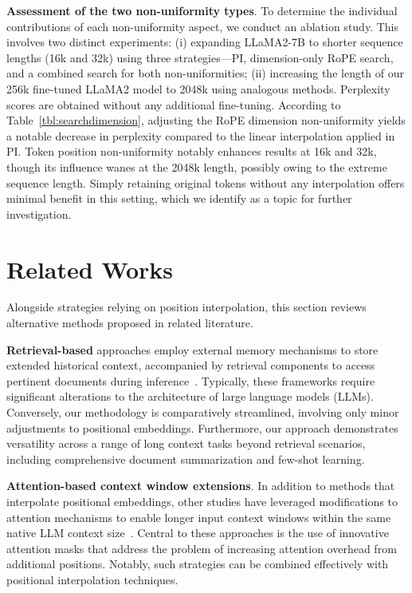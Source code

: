 \textbf{Assessment of the two non-uniformity types}. To determine the individual contributions of each non-uniformity aspect, we conduct an ablation study. This involves two distinct experiments: (i) expanding LLaMA2-7B to shorter sequence lengths (16k and 32k) using three strategies—PI, dimension-only RoPE search, and a combined search for both non-uniformities; (ii) increasing the length of our 256k fine-tuned LLaMA2 model to 2048k using analogous methods. Perplexity scores are obtained without any additional fine-tuning. According to Table~\ref{tbl:searchdimension}, adjusting the RoPE dimension non-uniformity yields a notable decrease in perplexity compared to the linear interpolation applied in PI. Token position non-uniformity notably enhances results at 16k and 32k, though its influence wanes at the 2048k length, possibly owing to the extreme sequence length. Simply retaining original tokens without any interpolation offers minimal benefit in this setting, which we identify as a topic for further investigation.

\section{Related Works}

Alongside strategies relying on position interpolation, this section reviews alternative methods proposed in related literature.

\textbf{Retrieval-based} approaches employ external memory mechanisms to store extended historical context, accompanied by retrieval components to access pertinent documents during inference~\cite{longllama,wang2023augmenting,borgeaud2022improving}. Typically, these frameworks require significant alterations to the architecture of large language models (LLMs). Conversely, our methodology is comparatively streamlined, involving only minor adjustments to positional embeddings. Furthermore, our approach demonstrates versatility across a range of long context tasks beyond retrieval scenarios, including comprehensive document summarization and few-shot learning.

\textbf{Attention-based context window extensions}. In addition to methods that interpolate positional embeddings, other studies have leveraged modifications to attention mechanisms to enable longer input context windows within the same native LLM context size~\cite{han2023lminfinite, streamingllm,parallelwindow}. Central to these approaches is the use of innovative attention masks that address the problem of increasing attention overhead from additional positions. Notably, such strategies can be combined effectively with positional interpolation techniques.

